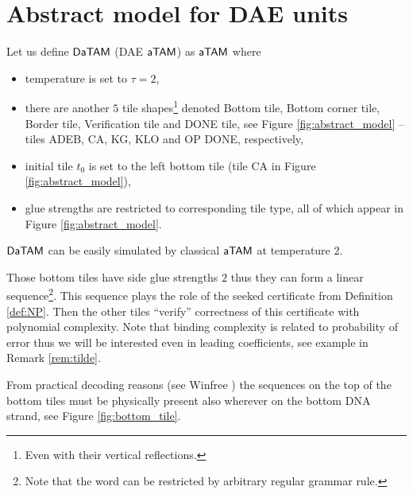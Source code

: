 \section{Abstract model for DAE units}

\begin{defn}
	Let us define $\mathsf{DaTAM}$ (DAE $\mathsf{aTAM}$) as $\mathsf{aTAM}$ where
	\begin{itemize}
		\item temperature is set to $\tau = 2$,
		\item there are another $5$ tile shapes\footnote{Even with their vertical reflections.} denoted Bottom tile, Bottom corner tile, Border tile, Verification tile and DONE tile, see Figure \ref{fig:abstract_model} -- tiles {\sf ADEB}, {\sf CA}, {\sf KG}, {\sf KLO} and {\sf OP DONE}, respectively,
		\item initial tile $t_0$ is set to the left bottom tile (tile {\sf CA} in Figure \ref{fig:abstract_model}),
		\item glue strengths are restricted to corresponding tile type, all of which appear in Figure \ref{fig:abstract_model}.
	\end{itemize}
\end{defn}

\begin{note}
	$\mathsf{DaTAM}$ can be easily simulated by classical $\mathsf{aTAM}$ at temperature $2$.
\end{note}

Those bottom tiles have side glue strengths $2$ thus they can form a linear sequence\footnote{Note that the word can be restricted by arbitrary regular grammar rule.}. This sequence plays the role of the seeked certificate from Definition \ref{def:NP}. Then the other tiles ``verify'' correctness of this certificate with polynomial complexity. Note that binding complexity is related to probability of error thus we will be interested even in leading coefficients, see example in Remark \ref{rem:tilde}.

From practical decoding reasons (see Winfree \cite{winfree_phd}) the sequences on the top of the bottom tiles must be physically present also wherever on the bottom DNA strand, see Figure \ref{fig:bottom_tile}.


